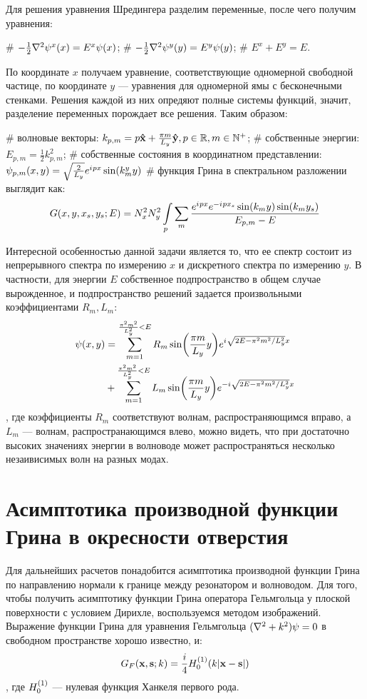 Для решения уравнения Шредингера разделим переменные, после чего получим уравнения:
\begin{ilist}
# $-\frac{1}{2} \laplacian \psi^x(x) = E^x \psi(x)$;
# $-\frac{1}{2} \laplacian \psi^y(y) = E^y \psi(y)$;
# $E^x + E^y = E$.
\end{ilist}
По координате $x$ получаем уравнение, соответствующие одномерной свободной частице, по координате $y$ — уравнения для одномерной ямы с бесконечными стенками. Решения каждой из них опредяют полные системы функций, значит, разделение переменных порождает все решения. Таким образом:
\begin{ilist}
# волновые векторы: $k_{p, m} = p \vb{\hat{x}} + \frac{\pi m}{L_y} \vb{\hat{y}}, p \in \mathbb{R}, m \in \mathbb{N}^+$;
# собственные энергии: $E_{p, m} = \frac{1}{2} k_{p, m}^2$;
# собственные состояния в координатном представлении: $\psi_{p, m}(x, y) = \sqrt{\frac{2}{L_y}} e^{{i\mkern1mu} p x} \sin(k^y_m y)$
# функция Грина в спектральном разложении выглядит как: 
\[
G(x, y, x_s, y_s; E) = N_x^2 N_y^2 \int\limits_p \sum\limits_m \frac{e^{{i\mkern1mu} p x} e^{-{i\mkern1mu} p x_s} \sin(k_m y) \sin(k_m y_s)}{E_{p, m} - E}
\]
\end{ilist}
Интересной особенностью данной задачи является то, что ее спектр состоит из непрерывного спектра по измерению $x$ и дискретного спектра по измерению $y$. В частности, для энергии $E$ собственное подпространство в общем случае вырожденное, и подпространство решений задается произвольными коэффициентами $R_m, L_m$:
\begin{align*}
\psi(x, y)
& = \sum\limits_{m = 1}^{\frac{\pi^2 m^2}{L_y^2} < E} R_m \sin(\frac{\pi m}{L_y} y) e^{{i\mkern1mu} \sqrt{2 E - \pi^2 m^2 / L_y^2} x} \\
& + \sum\limits_{m = 1}^{\frac{\pi^2 m^2}{L_y^2} < E} L_m \sin(\frac{\pi m}{L_y} y) e^{-{i\mkern1mu} \sqrt{2 E - \pi^2 m^2 / L_y^2} x}
\end{align*}
, где коэффициенты $R_m$ соответствуют волнам, распространяющимся вправо, а $L_m$ — волнам, распространающимся влево, можно видеть, что при достаточно высоких значениях энергии в волноводе может распространяться несколько незаивисимых волн на разных модах.

\section{Асимптотика производной функции Грина в окресности отверстия}
Для дальнейших расчетов понадобится асимптотика производной функции Грина по направлению нормали к границе между резонатором и волноводом. Для того, чтобы получить асимптотику функции Грина оператора Гельмгольца у плоской поверхности с условием Дирихле, воспользуемся методом изображений. Выражение функции Грина для уравнения Гельмгольца $(\laplacian + k^2) \psi = 0$ в свободном пространстве хорошо известно, и:
\[
G_F(\vb{x}, \vb{s}; k) = \frac{i}{4} H_{0}^{(1)}(k |\vb{x} - \vb{s}|)
\],
где $H_{0}^{(1)}$ — нулевая функция Ханкеля первого рода\cite{hankel_first_kind}.

